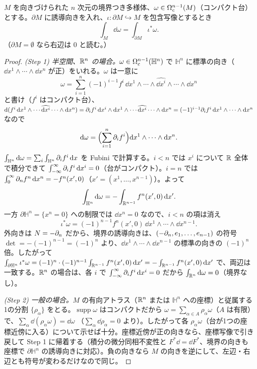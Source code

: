 \begin{thm}\label{B:thm:stokes}\tP
$M$ を向きづけられた $n$ 次元の境界つき多様体、$\omega\in\Omega^{n-1}_c(M)$（コンパクト台）とする。$\partial M$ に誘導向きを入れ、$\iota:\partial M\hookrightarrow M$ を包含写像とするとき
\[
\int_M\dd\omega=\int_{\partial M}\iota^*\omega .
\]
（$\partial M=\emptyset$ なら右辺は $0$ と読む。）
\end{thm}
\begin{proof}
\emph{(Step 1) 半空間、$\mathbb R^n$ の場合。}$\omega\in\Omega^{n-1}_c(\mathbb H^n)$ で $\mathbb H^n$ に標準の向き（$\dd x^1\wedge\cdots\wedge\dd x^n$ が正）をいれる。$\omega$ は一意に
\[
\omega=\sum_{i=1}^n(-1)^{i-1}f^i\,\dd x^1\wedge\cdots\wedge\widehat{\dd x^i}\wedge\cdots\wedge\dd x^n
\]
と書け（$f^i$ はコンパクト台）、$\mathrm{d}(f^i\,\mathrm{d} x^1\wedge\cdots\widehat{\mathrm{d} x^i}\cdots\wedge\mathrm{d} x^n)=\partial_if^i\,\mathrm{d} x^i\wedge\mathrm{d} x^1\wedge\cdots\widehat{\mathrm{d} x^i}\cdots\wedge\mathrm{d} x^n=(-1)^{i-1}\partial_if^i\,\mathrm{d} x^1\wedge\cdots\wedge\mathrm{d} x^n$ なので
\[
\mathrm{d}\omega=\Bigl(\sum_{i=1}^n\partial_if^i\Bigr)\mathrm{d} x^1\wedge\cdots\wedge\mathrm{d} x^n .
\]
$\int_{\mathbb H^n}\mathrm{d}\omega=\sum_i\int_{\mathbb H^n}\partial_if^i\,\mathrm{d} x$ を Fubini で計算する。$i<n$ では $x^i$ について $\mathbb R$ 全体で積分できて $\int_{-\infty}^\infty\partial_if^i\,\mathrm{d} x^i=0$（台がコンパクト）。$i=n$ では $\int_0^{\infty}\partial_nf^n\,\mathrm{d} x^n=-f^n(x',0)$（$x'=(x^1,\dots,x^{n-1})$）。よって
\[
\int_{\mathbb H^n}\mathrm{d}\omega=-\int_{\mathbb R^{n-1}}f^n(x',0)\,\mathrm{d} x'.
\]
一方 $\partial\mathbb H^n=\{x^n=0\}$ への制限では $\dd x^n=0$ なので、$i<n$ の項は消え
\[
\iota^*\omega=(-1)^{n-1}f^n(x',0)\,\dd x^1\wedge\cdots\wedge\dd x^{n-1}.
\]
外向きは $N=-\partial_n$ だから、境界の誘導向きは、$(-\partial_n,e_1,\dots,e_{n-1})$ の符号 $\det=-(-1)^{n-1}=(-1)^n$ より、$\dd x^1\wedge\cdots\wedge\dd x^{n-1}$ の標準の向きの $(-1)^{n}$ 倍。したがって
$\int_{\partial\mathbb H^n}\iota^*\omega=(-1)^{n}\cdot(-1)^{n-1}\int_{\mathbb R^{n-1}}f^n(x',0)\,\mathrm{d} x'=-\int_{\mathbb R^{n-1}}f^n(x',0)\,\mathrm{d} x'$ で、両辺は一致する。$\mathbb R^n$ の場合は、各 $i$ で $\int_{-\infty}^\infty\partial_if^i\,\mathrm{d} x^i=0$ だから $\int_{\mathbb R^n}\mathrm{d}\omega=0$（境界なし）。

\emph{(Step 2) 一般の場合。}$M$ の有向アトラス（$\mathbb R^n$ または $\mathbb H^n$ への座標）と従属する1の分割 $\{\rho_\alpha\}$ をとる。$\operatorname{supp}\omega$ はコンパクトだから $\omega=\sum_{\alpha\in A}\rho_\alpha\omega$（$A$ は有限）で、$\sum_\alpha\dd(\rho_\alpha\omega)=\dd\omega$ （$\sum_\alpha\dd\rho_\alpha=0$ より）。したがって各 $\rho_\alpha\omega$（台が1つの座標近傍に入る）について示せば十分。座標近傍が正の向きなら、座標写像で引き戻して Step 1 に帰着する（積分の微分同相不変性と $F^*\dd=\dd F^*$、境界の向きも座標で $\partial\mathbb H^n$ の誘導向きに対応）。負の向きなら $M$ の向きを逆にして、左辺・右辺とも符号が変わるだけなので同じ。
\end{proof}

